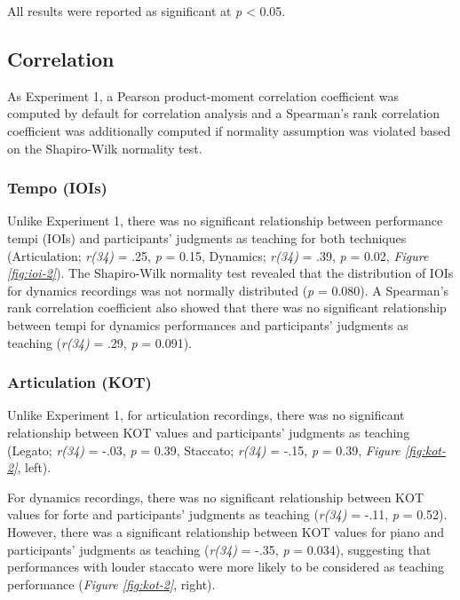 \documentclass[
  man,floatsintext]{apa6}
\begin{document}
All results were reported as significant at \emph{p} \textless{} 0.05.

\hypertarget{correlation-1}{%
\subsection{Correlation}\label{correlation-1}}

As Experiment 1, a Pearson product-moment correlation coefficient was computed by default for correlation analysis and a Spearman's rank correlation coefficient was additionally computed if normality assumption was violated based on the Shapiro-Wilk normality test.

\hypertarget{tempo-iois-1}{%
\subsubsection{Tempo (IOIs)}\label{tempo-iois-1}}

Unlike Experiment 1, there was no significant relationship between performance tempi (IOIs) and participants' judgments as teaching for both techniques (Articulation; \emph{r(34)} = .25, \emph{p} = 0.15, Dynamics; \emph{r(34)} = .39, \emph{p} = 0.02, \emph{Figure \ref{fig:ioi-2}}). The Shapiro-Wilk normality test revealed that the distribution of IOIs for dynamics recordings was not normally distributed (\emph{p} = 0.080). A Spearman's rank correlation coefficient also showed that there was no significant relationship between tempi for dynamics performances and participants' judgments as teaching (\emph{r(34)} = .29, \emph{p} = 0.091).

\hypertarget{articulation-kot-1}{%
\subsubsection{Articulation (KOT)}\label{articulation-kot-1}}

Unlike Experiment 1, for articulation recordings, there was no significant relationship between KOT values and participants' judgments as teaching (Legato; \emph{r(34)} = -.03, \emph{p} = 0.39, Staccato; \emph{r(34)} = -.15, \emph{p} = 0.39, \emph{Figure \ref{fig:kot-2}}, left).

For dynamics recordings, there was no significant relationship between KOT values for forte and participants' judgments as teaching (\emph{r(34)} = -.11, \emph{p} = 0.52). However, there was a significant relationship between KOT values for piano and participants' judgments as teaching (\emph{r(34)} = -.35, \emph{p} = 0.034), suggesting that performances with louder staccato were more likely to be considered as teaching performance (\emph{Figure \ref{fig:kot-2}}, right).
\end{document}
